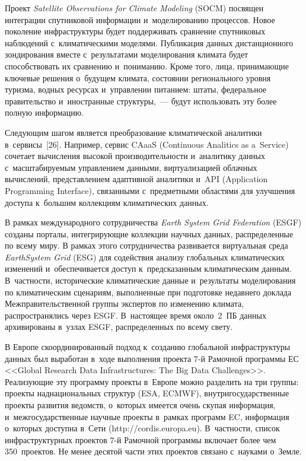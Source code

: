 \begin{multicols}{2}
  Проект \textit{Satellite Observations for Climate Modeling} (SOCM) посвящен 
  интеграции 
спутниковой информации и~моделированию процессов. Новое поколение инфраструктуры 
будет поддерживать сравнение спутниковых наблюдений с~климатическими моделями. 
Публикация данных дистанционного зондирования вместе с~результатами моделирования 
климата будет способствовать их сравнению и~пониманию. Кроме того, лица, 
принимающие ключевые решения о~будущем климата, состоянии регионального уровня 
туризма, водных ресурсах и~управлении питанием: штаты, федеральное правительство 
и~иностранные структуры,~--- будут использовать эту более полную информацию. 
  
  Следующим шагом является преобразование климатической аналитики в~сервисы~[26]. 
Например, сервис CAaaS (Continuous Analitics as a~Service)
сочетает вычисления высокой производительности и~аналитику 
данных с~масштабируемым управ\-ле\-ни\-ем данными, виртуализацией облачных вычислений, 
представлением адаптивной аналитики и~API (Application Programming Interface), связанными с~предметными областями для 
улучшения доступа к~большим коллекциям климатических данных.
  
  В рамках международного сотрудничества \textit{Earth System Grid Federation} (ESGF) 
созданы порталы, интегрирующие коллекции научных данных, распределенные по всему 
миру. В рамках этого сотрудничества развивается виртуальная среда \textit{Earth\linebreak System 
Grid} (ESG) для содействия анализу глобальных климатических изменений 
и~обеспечивается доступ к~предсказанным климатическим данным. В~частности, 
исторические климатические данные и~результаты моделирования по климатическим 
сценариям, выполненные при подготовке недавнего доклада Межправительственной группы
экспертов по изменению климата, распространялись 
через ESGF. В~настоящее время около~2~ПБ данных архивированы в~узлах ESGF, 
распределенных по всему свету.
  
  В Европе скоординированный подход к~созданию глобальной инфраструктуры данных 
был выработан в~ходе выполнения проекта 7-й Рамочной программы ЕС <<Global Research 
Data Infrastructures: The Big Data Challenges>>. Реализующие эту программу проекты 
в~Европе можно разделить на три группы: проекты наднациональных структур (ESA, 
ECMWF), внутригосударственные проекты развития ведомств, о~которых имеется очень 
скупая информация, и~межгосударственные научные проекты в~рамках программ EC, 
информация о~которых доступна в~Сети ({\sf http://cordis.europa.eu}). В~частности, список 
инфраструктурных проектов 7-й Рамочной программы включает более чем 350~проектов. 
Не менее десятой части этих проектов связано с~науками о~Земле. 
  

\end{multicols}
